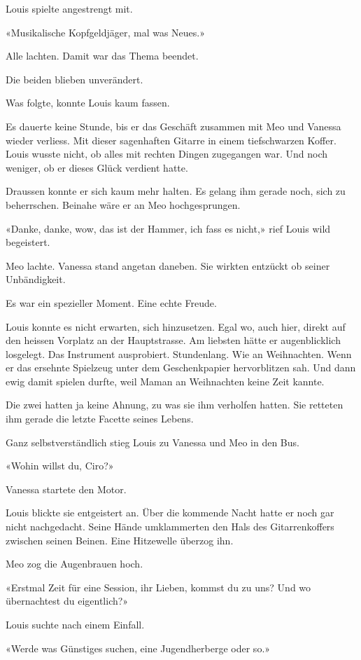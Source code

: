 Louis spielte angestrengt mit.

«Musikalische Kopfgeldjäger, mal was Neues.»

Alle lachten. Damit war das Thema beendet.

Die beiden blieben unverändert.

Was folgte, konnte Louis kaum fassen.

Es dauerte keine Stunde, bis er das Geschäft zusammen mit Meo und
Vanessa wieder verliess. Mit dieser sagenhaften Gitarre in einem
tiefschwarzen Koffer. Louis wusste nicht, ob alles mit rechten Dingen
zugegangen war. Und noch weniger, ob er dieses Glück verdient hatte.

Draussen konnte er sich kaum mehr halten. Es gelang ihm gerade noch,
sich zu beherrschen. Beinahe wäre er an Meo hochgesprungen.

«Danke, danke, wow, das ist der Hammer, ich fass es nicht,» rief Louis
wild begeistert.

Meo lachte. Vanessa stand angetan daneben. Sie wirkten entzückt ob
seiner Unbändigkeit.

Es war ein spezieller Moment. Eine echte Freude.

Louis konnte es nicht erwarten, sich hinzusetzen. Egal wo, auch hier,
direkt auf den heissen Vorplatz an der Hauptstrasse. Am liebsten hätte
er augenblicklich losgelegt. Das Instrument ausprobiert. Stundenlang.
Wie an Weihnachten. Wenn er das ersehnte Spielzeug unter dem
Geschenkpapier hervorblitzen sah. Und dann ewig damit spielen durfte,
weil Maman an Weihnachten keine Zeit kannte.

Die zwei hatten ja keine Ahnung, zu was sie ihm verholfen hatten. Sie
retteten ihm gerade die letzte Facette seines Lebens.

Ganz selbstverständlich stieg Louis zu Vanessa und Meo in den Bus.

«Wohin willst du, Ciro?»

Vanessa startete den Motor.

Louis blickte sie entgeistert an. Über die kommende Nacht hatte er noch
gar nicht nachgedacht. Seine Hände umklammerten den Hals des
Gitarrenkoffers zwischen seinen Beinen. Eine Hitzewelle überzog ihn.

Meo zog die Augenbrauen hoch.

«Erstmal Zeit für eine Session, ihr Lieben, kommst du zu uns? Und wo
übernachtest du eigentlich?»

Louis suchte nach einem Einfall.

«Werde was Günstiges suchen, eine Jugendherberge oder so.»

